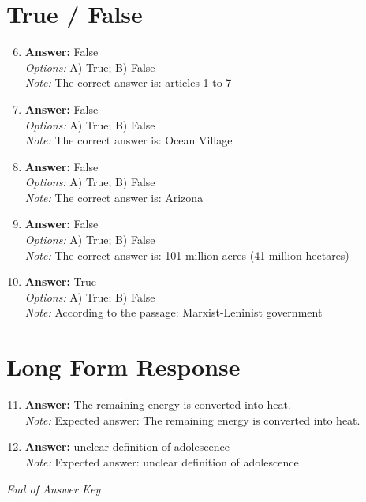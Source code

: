 \documentclass[12pt]{article}
\begin{document}
\section*{True / False}
\begin{enumerate}[label=\arabic*.]
\setcounter{enumi}{5}
\item \textbf{Answer:} False
\\ \textit{Options:} A) True; B) False
\\ \textit{Note:} The correct answer is: articles 1 to 7
\item \textbf{Answer:} False
\\ \textit{Options:} A) True; B) False
\\ \textit{Note:} The correct answer is: Ocean Village
\item \textbf{Answer:} False
\\ \textit{Options:} A) True; B) False
\\ \textit{Note:} The correct answer is: Arizona
\item \textbf{Answer:} False
\\ \textit{Options:} A) True; B) False
\\ \textit{Note:} The correct answer is: 101 million acres (41 million hectares)
\item \textbf{Answer:} True
\\ \textit{Options:} A) True; B) False
\\ \textit{Note:} According to the passage: Marxist-Leninist government
\end{enumerate}

\section*{Long Form Response}
\begin{enumerate}[label=\arabic*.]
\setcounter{enumi}{10}
\item \textbf{Answer:} The remaining energy is converted into heat.
\\ \textit{Note:} Expected answer: The remaining energy is converted into heat.
\item \textbf{Answer:} unclear definition of adolescence
\\ \textit{Note:} Expected answer: unclear definition of adolescence
\end{enumerate}

\vfill
\noindent\textit{End of Answer Key}
\end{document}
